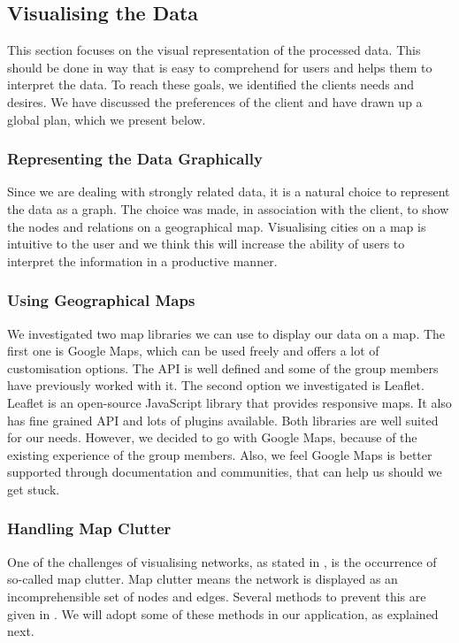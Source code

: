 \subsection{Visualising the Data}

This section focuses on the visual representation of the processed data. This should be done in way that is easy to comprehend for users and helps them to interpret the data. To reach these goals, we identified the clients needs and desires. We have discussed the preferences of the client and have drawn up a global plan, which we present below.

\subsubsection{Representing the Data Graphically}

Since we are dealing with strongly related data, it is a natural choice to represent the data as a graph. The choice was made, in association with the client, to show the nodes and relations on a geographical map. Visualising cities on a map is intuitive to the user and we think this will increase the ability of users to interpret the information in a productive manner.

\subsubsection{Using Geographical Maps}

We investigated two map libraries we can use to display our data on a map. The first one is Google Maps, which can be used freely and offers a lot of customisation options. The API is well defined and some of the group members have previously worked with it. The second option we investigated is Leaflet. Leaflet is an open-source JavaScript library that provides responsive maps. It also has fine grained API and lots of plugins available.
Both libraries are well suited for our needs. However, we decided to go with Google Maps, because of the existing experience of the group members. Also, we feel Google Maps is better supported through documentation and communities, that can help us should we get stuck.

\subsubsection{Handling Map Clutter}

One of the challenges of visualising networks, as stated in \cite{468391}, is the occurrence of so-called map clutter. Map clutter means the network is displayed as an incomprehensible set of nodes and edges.
Several methods to prevent this are given in \cite{468391}. We will adopt some of these methods in our application, as explained next.

